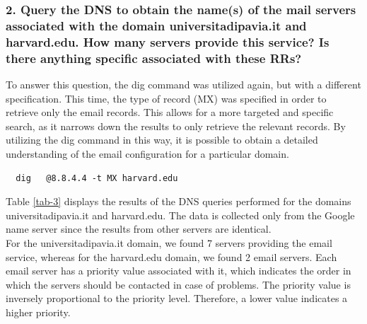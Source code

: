 \documentclass[eng]{class}
\begin{document}
\subsubsection*{2. Query the DNS to obtain the name(s) of the mail servers associated with the
    domain universitadipavia.it and harvard.edu. How many servers
    provide this service? Is there anything specific associated with these RRs?}

To answer this question, the dig command was utilized again, but with a different specification.
This time, the type of record (MX) was specified in order to retrieve only the email records.
This allows for a more targeted and specific search, as it narrows down the results to only retrieve the relevant records.
By utilizing the dig command in this way, it is possible to obtain a detailed understanding of the email configuration for a particular domain.
\begin{lstlisting}
  dig   @8.8.4.4 -t MX harvard.edu
\end{lstlisting}
Table \ref*{tab-3} displays the results of the DNS queries performed for the domains universitadipavia.it and harvard.edu.
The data is collected only from the Google name server since the results from other servers are identical.\\
For the universitadipavia.it domain, we found 7 servers providing the email service, whereas for the harvard.edu domain, we found 2 email servers.
Each email server has a priority value associated with it, which indicates the order in which the servers should be contacted in case of problems.
The priority value is inversely proportional to the priority level. Therefore, a lower value indicates a higher priority.
\end{document}
